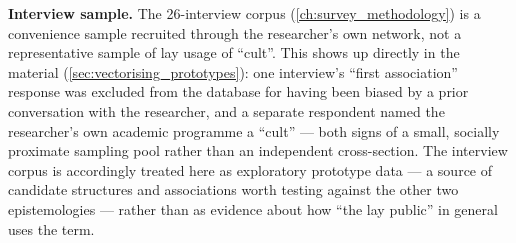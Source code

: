\textbf{Interview sample.} The 26-interview corpus (\ref{ch:survey_methodology}) is a convenience sample recruited through the researcher's own network, not a representative sample of lay usage of \enquote{cult}. This shows up directly in the material (\ref{sec:vectorising_prototypes}): one interview's \enquote{first association} response was excluded from the database for having been biased by a prior conversation with the researcher, and a separate respondent named the researcher's own academic programme a \enquote{cult} — both signs of a small, socially proximate sampling pool rather than an independent cross-section. The interview corpus is accordingly treated here as exploratory prototype data — a source of candidate structures and associations worth testing against the other two epistemologies — rather than as evidence about how \enquote{the lay public} in general uses the term.

